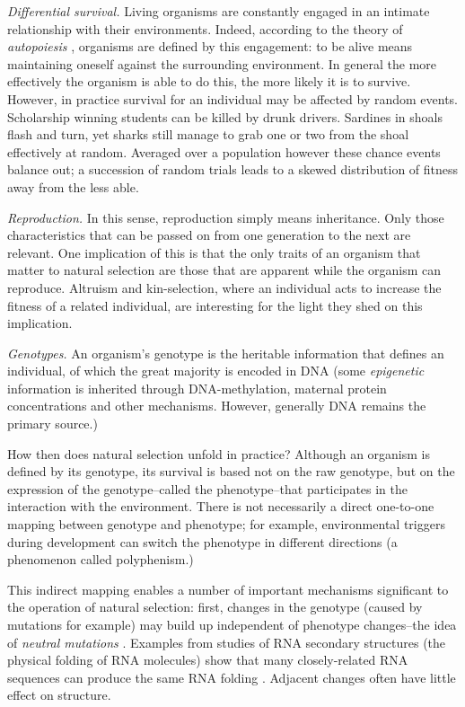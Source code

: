 \emph{Differential survival.} Living organisms are constantly engaged in an intimate relationship with their environments. Indeed, according to the theory of \emph{autopoiesis} \parencite{Varela:1974qd}, organisms are defined by this engagement: to be alive means maintaining oneself against the surrounding environment. In general the more effectively the organism is able to do this, the more likely it is to survive. However, in practice survival for an individual may be affected by random events. Scholarship winning students can be killed by drunk drivers. Sardines in shoals flash and turn, yet sharks still manage to grab one or two from the shoal effectively at random. Averaged over a population however these chance events balance out; a succession of random trials leads to a skewed distribution of fitness away from the less able.

\emph{Reproduction.} In this sense, reproduction simply means inheritance. Only those characteristics that can be passed on from one generation to the next are relevant. One implication of this is that the only traits of an organism that matter to natural selection are those that are apparent while the organism can reproduce. Altruism and kin-selection, where an individual acts to increase the fitness of a related individual, are interesting for the light they shed on this implication.

\emph{Genotypes.} An organism's \gls{genotype} is the heritable information that defines an individual, of which the great majority is encoded in DNA (some \emph{epigenetic} information is inherited through DNA-methylation, maternal protein concentrations and other mechanisms. However, generally DNA remains the primary source.)

How then does natural selection unfold in practice? Although an organism is defined by its genotype, its survival is based not on the raw genotype, but on the expression of the genotype--called the \gls{phenotype}--that participates in the interaction with the environment. There is not necessarily a direct one-to-one mapping between genotype and phenotype; for example, environmental triggers during development can switch the phenotype in different directions (a phenomenon called \gls{polyphenism}.)

This indirect mapping enables a number of important mechanisms significant to the operation of natural selection: first, changes in the genotype (caused by mutations for example) may build up independent of phenotype changes--the idea of \emph{neutral mutations} \parencite{Ohta:1996vn,Ohta:2002ys,Ohta:1973kx}. Examples from studies of RNA secondary structures (the physical folding of RNA molecules) show that many closely-related RNA sequences can produce the same RNA folding \parencite{Fontana:1993zn}. Adjacent changes often have little effect on structure.

